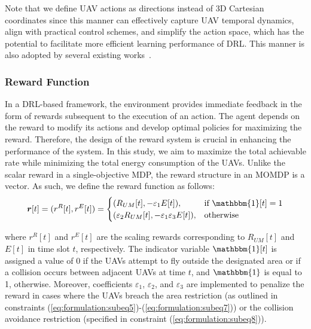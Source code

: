 \documentclass[10pt,journal,compsoc]{IEEEtran}
\begin{document}
\noindent Note that we define UAV actions as directions instead of 3D Cartesian coordinates since this manner can effectively capture UAV temporal dynamics, align with practical control schemes, and simplify the action space, which has the potential to facilitate more efficient learning performance of DRL. This manner is also adopted by several existing works~\cite{Zhang2021, Mei2022, Bayerlein2021, Li2020a}.

\subsubsection{Reward Function}

\par In a DRL-based framework, the environment provides immediate feedback in the form of rewards subsequent to the execution of an action. The agent depends on the reward to modify its actions and develop optimal policies for maximizing the reward. Therefore, the design of the reward system is crucial in enhancing the performance of the system. In this study, we aim to maximize the total achievable rate while minimizing the total energy consumption of the UAVs. Unlike the scalar reward in a single-objective MDP, the reward structure in an MOMDP is a vector. As such, we define the reward function as follows:
\begin{equation}
    \boldsymbol{r}[t] = ( r^R[t], r^E[t]) = 
    \begin{cases}
        ( R_{UM}[t], -\varepsilon_1 E[t]),& \text{if $\mathbbm{1}[t] = 1$} \\
        (\varepsilon_2 R_{UM}[t], -\varepsilon_1 \varepsilon_3 E[t]),& \text{otherwise} 
    \end{cases}
\end{equation}

\noindent where $r^R[t]$ and $r^E[t]$ are the scaling rewards corresponding to $R_{UM}[t]$ and $E[t]$ in time slot $t$, respectively. The indicator variable $\mathbbm{1}[t]$ is assigned a value of 0 if the UAVs attempt to fly outside the designated area or if a collision occurs between adjacent UAVs at time $t$, and $\mathbbm{1}$ is equal to 1, otherwise. Moreover, coefficients $\varepsilon_1$, $\varepsilon_2$, and $\varepsilon_3$ are implemented to penalize the reward in cases where the UAVs breach the area restriction (as outlined in constraints (\ref{eq:formulation:subeq5})-(\ref{eq:formulation:subeq7})) or the collision avoidance restriction (specified in constraint (\ref{eq:formulation:subeq8})).
\end{document}
